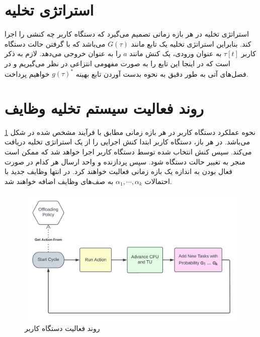 \section{استراتژی تخلیه}
استراتژی تخلیه در هر بازه زمانی تصمیم می‌گیرد که دستگاه کاربر چه کنشی را اجرا کند. بنابراین استراتژی تخلیه یک تابع مانند $G(\tau)$ می‌باشد که با گرفتن حالت دستگاه کاربر $\tau[t]$ به عنوان ورودی، یک کنش مانند \(a\) را به عنوان خروجی می‌دهد. لازم به ذکر است که در اینجا این تابع را به صورت مفهومی انتزاعی در نظر می‌گیریم و در فصل‌های آتی به طور دقیق به نحوه بدست آوردن تابع بهینه $g(\tau)^{*}$ خواهیم پرداخت.
\newpage
\section{روند فعالیت سیستم تخلیه وظایف}
نحوه عملکرد دستگاه کاربر در هر بازه زمانی مطابق با فرآیند مشخص شده در شکل \ref{fig:ueproc} می‌باشد. در هر باز، دستگاه کاربر ابتدا کنش اجرایی را از یک استراتژی تخلیه دریافت می‌کند. سپس کنش انتخاب شده توسط دستگاه کاربر اجرا خواهد شد که ممکن است منجر به تغییر حالت دستگاه شود. سپس پردازنده و واحد ارسال هر کدام در صورت فعال بودن به اندازه یک بازه زمانی فعالیت خواهند کرد. در انتها وظایف جدید با احتمالات
$\alpha_1, \cdots, \alpha_k$
به صف‌های وظایف اضافه خواهند شد.


\begin{figure}[H]
	\centering
	\includegraphics[width=\textwidth]{figures/ueproc.png}
	\caption{روند فعالیت دستگاه کاربر}
	\label{fig:ueproc}
\end{figure}